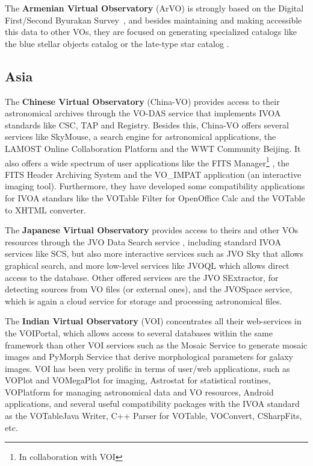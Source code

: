 The \textbf{Armenian Virtual Observatory} (ArVO) is strongly based on the
Digital First/Second Byurakan Survey~\cite{}, 
and besides maintaining and making accessible this data to other VOs,
they are focused on generating specialized catalogs like the
blue stellar objects catalog or the late-type star catalog \cite{}.

\subsection{Asia}

The \textbf{Chinese Virtual Observatory} (China-VO) provides
access to their astronomical archives through the VO-DAS service
that implements IVOA standards like CSC, TAP and Registry. 
Besides this, China-VO offers several services like SkyMouse,
a search engine for astronomical applications, the LAMOST Online
Collaboration Platform and the WWT Community Beijing. It also
offers a wide spectrum of user applications like the FITS Manager\footnote{In
collaboration with VOI} \cite{}, 
the FITS Header Archiving System and the VO\_IMPAT
application (an interactive imaging tool). Furthermore, they have developed
some compatibility applications for IVOA standars like the
VOTable Filter for OpenOffice Calc and the 
VOTable to XHTML converter. 

The \textbf{Japanese Virtual Observatory} provides access to theirs
and other VOs resources through the JVO Data Search service \cite{}, 
including standard IVOA services like SCS, but also more interactive services
such as JVO Sky that allows graphical search, and more low-level
services like JVOQL which allows direct access to the database.
Other offered services are the JVO SExtractor, for detecting sources
from VO files (or external ones), and the JVOSpace service, which is
again a cloud service for storage and processing astronomical files.

The \textbf{Indian Virtual Observatory} (VOI)
concentrates all their web-services in the VOIPortal, which allows
access to several databases within the same framework than other
VOI services such as the Mosaic Service to generate mosaic images 
and PyMorph Service that derive morphological parameters for galaxy
images. VOI has been very prolific in terms of user/web applications, 
such as VOPlot and 
VOMegaPlot for imaging, Astrostat for statistical routines, VOPlatform for
managing astronomical data and VO resources, Android applications, and 
several useful compatibility packages with the IVOA standard as 
the VOTableJava Writer, C++ Parser for VOTable, VOConvert, CSharpFits, etc.

